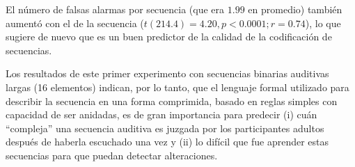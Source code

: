 
El número de falsas alarmas por secuencia (que era $1.99$ en promedio) también aumentó con el \mdlbin de la secuencia ($t(214.4)= 4.20, p <0.0001; r = 0.74$), lo que sugiere de nuevo que \mdlbin es un buen predictor de la calidad de la codificación de secuencias.


Los resultados de este primer experimento con secuencias binarias auditivas largas (16 elementos) indican, por lo tanto, que el lenguaje formal utilizado para describir la secuencia en una forma comprimida, basado en reglas simples con capacidad de ser anidadas, es de gran importancia para predecir (i) cuán ``compleja'' una secuencia auditiva es juzgada por los participantes adultos después de haberla escuchado una vez y (ii) lo difícil que fue aprender estas secuencias para que puedan detectar alteraciones.


